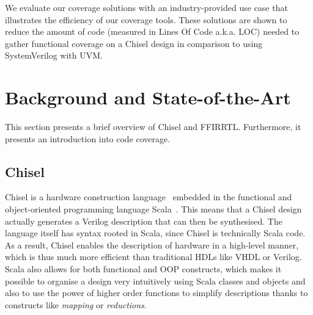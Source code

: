 \documentclass[runningheads]{llncs}
\begin{document}
We evaluate our coverage solutions with an industry-provided use case that illustrates the efficiency of our coverage tools. These solutions are shown to reduce the amount of code (measured in Lines Of Code a.k.a. LOC) needed to gather functional coverage on a Chisel design in comparison to using SystemVerilog with UVM.

\section{Background and State-of-the-Art}
\label{sec:background}
This section presents a brief overview of Chisel and FFIRRTL. Furthermore, it presents an introduction into code coverage.

\subsection{Chisel}
Chisel is a hardware construction language~\cite{chisel:dac2012, chisel:book} embedded in the functional and object-oriented programming language Scala~\cite{Scala}. This means that a Chisel design actually generates a Verilog description that can then be synthesised. The language itself has syntax rooted in Scala, since Chisel is technically Scala code. As a result, Chisel enables the description of hardware in a high-level manner, which is thus much more efficient than traditional HDLs like VHDL or Verilog. Scala also allows for both functional and OOP constructs, which makes it possible to organise a design very intuitively using Scala classes and objects and also to use the power of higher order functions to simplify descriptions thanks to constructs like \textit{mapping} or \textit{reductions}.
\end{document}
